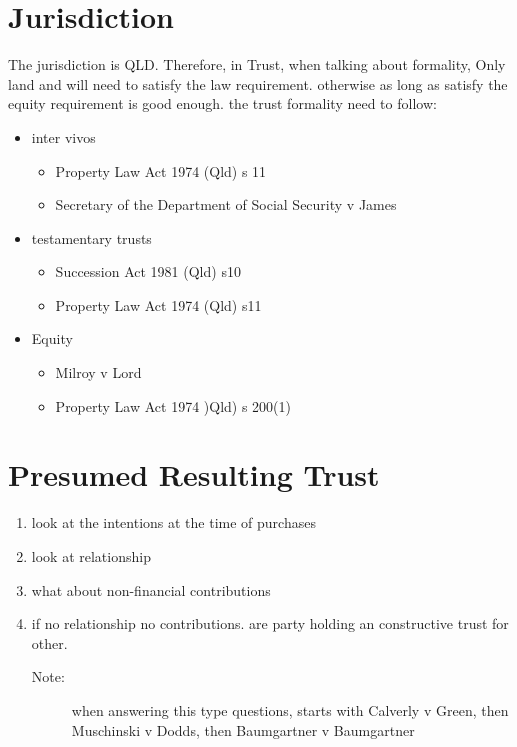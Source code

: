 \section*{Jurisdiction}
The jurisdiction is QLD. Therefore, in Trust, when talking about formality, Only land and will need to satisfy the law requirement. otherwise as long as satisfy the equity requirement is good enough. the trust formality need to follow:
\begin{itemize}
    \item inter vivos
        \begin{itemize}
            \item Property Law Act 1974 (Qld) s 11
            \item Secretary of the Department of Social Security v James
        \end{itemize}
    \item testamentary trusts
        \begin{itemize}
            \item Succession Act 1981 (Qld) s10
            \item Property Law Act 1974 (Qld) s11
        \end{itemize}
    \item Equity
        \begin{itemize}
            \item Milroy v Lord
            \item Property Law Act 1974 )Qld) s 200(1)
        \end{itemize}
\end{itemize}

\section*{Presumed Resulting Trust}
\begin{enumerate}
    \item look at the intentions at the time of purchases
    \item look at relationship
    \item what about non-financial contributions
    \item if no relationship no contributions. are party holding an constructive trust for other. 
    \begin{description}
        \item[Note:]when answering this type questions, starts with Calverly v Green, then Muschinski v Dodds, then Baumgartner v Baumgartner
    \end{description}
\end{enumerate}



